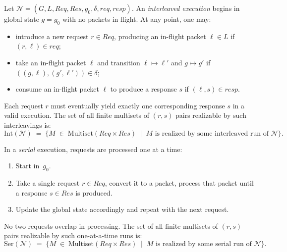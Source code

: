 \begin{definition}
    Let \(\mathcal{N} = (G, L, \mathit{Req}, \mathit{Res}, g_0, \delta, \mathit{req}, \mathit{resp})\).
    An \emph{interleaved execution} begins in global state \(g = g_0\) with no packets in flight.
    At any point, one may:
    \begin{itemize}
        \item introduce a new request \(r \in \mathit{Req}\), producing an in-flight packet \(\ell \in L\) if \((r,\ell) \in \mathit{req}\);
        \item take an in-flight packet \(\ell\) and transition \(\ell \mapsto \ell'\) and \(g \mapsto g'\) if \(((g,\ell),(g',\ell'))\in\delta\);
        \item consume an in-flight packet \(\ell\) to produce a response \(s\) if \((\ell,s)\in \mathit{resp}\).
    \end{itemize}
    Each request \(r\) must eventually yield exactly one corresponding response \(s\) in a valid execution.
    The set of all finite multisets of \((r,s)\) pairs realizable by such interleavings is:
    \[
        \mathrm{Int}(\mathcal{N})
        \;=\;
        \bigl\{
        M \;\in\; \text{Multiset}(\mathit{Req}\times \mathit{Res})
        \;\mid\;
        M \text{ is realized by some interleaved run of }\mathcal{N}
        \bigr\}.
    \]
\end{definition}

\begin{definition}
In a \emph{serial} execution, requests are processed one at a time:
\begin{enumerate}
    \item Start in \(\,g_0\).
    \item Take a single request \(r\in \mathit{Req}\), convert it to a packet, process that packet until a response \(s\in \mathit{Res}\) is produced.
    \item Update the global state accordingly and repeat with the next request.
\end{enumerate}
No two requests overlap in processing.
The set of all finite multisets of \((r,s)\) pairs realizable by such one-at-a-time runs is:
\[
    \mathrm{Ser}(\mathcal{N})
    \;=\;
    \bigl\{
    M \;\in\; \text{Multiset}(\mathit{Req}\times \mathit{Res})
    \;\mid\;
    M \text{ is realized by some serial run of }\mathcal{N}
    \bigr\}.
\]
\end{definition}



